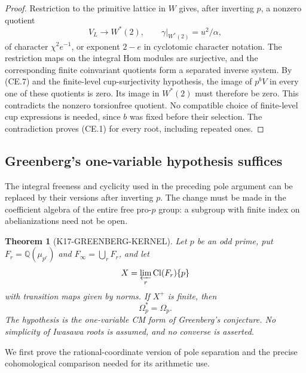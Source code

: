 \documentclass[11pt,a4paper]{article}
\newtheorem{theorem}{Theorem}[section]
\theoremstyle{definition}
\begin{document}
\begin{proof}
Restriction to the primitive lattice in $W$ gives, after inverting
$p$, a nonzero quotient
\[
 V_L\longrightarrow W^*(2),\qquad
 \gamma|_{W^*(2)}=u^2/\alpha,
\]
of character $\chi^2e^{-1}$, or exponent $2-e$ in cyclotomic
character notation. The restriction maps on the integral Hom
modules are surjective, and the corresponding finite coinvariant
quotients form a separated inverse system. By (CE.7) and the
finite-level cup-surjectivity hypothesis, the image of $p^bV$ in
every one of these quotients is zero. Its image in $W^*(2)$ must
therefore be zero. This contradicts the nonzero torsionfree
quotient. No compatible choice of finite-level cup expressions is
needed, since $b$ was fixed before their selection. The contradiction
proves (CE.1) for every root, including repeated ones.
\end{proof}

\subsection{Greenberg's one-variable hypothesis suffices}
\label{sec:greenberg-kernel}

The integral freeness and cyclicity used in the preceding pole argument
can be replaced by their versions after inverting $p$. The change must
be made in the coefficient algebra of the entire free pro-$p$ group:
a subgroup with finite index on abelianizations need not be open.

\begin{theorem}[K17-GREENBERG-KERNEL]\label{thm:greenberg-kernel}
Let $p$ be an odd prime, put $F_r=\mathbb Q(\mu_{p^r})$ and
$F_\infty=\bigcup_r F_r$, and let
\[
 X=\varprojlim_r\operatorname{Cl}(F_r)\{p\}
\]
with transition maps given by norms. If $X^+$ is finite, then
\[
 \Omega_p^*=\Omega_p.
\]
The hypothesis is the one-variable CM form of Greenberg's conjecture.
No simplicity of Iwasawa roots is assumed, and no converse is asserted.
\end{theorem}

We first prove the rational-coordinate version of pole separation and
the precise cohomological comparison needed for its arithmetic use.
\end{document}

